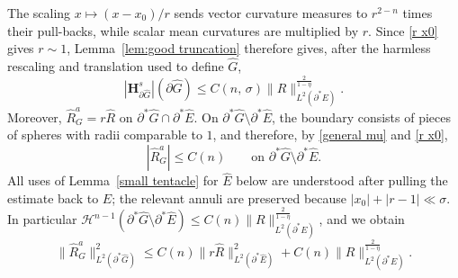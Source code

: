 \documentclass[reqno,11pt]{amsart}
\def\sz{\sigma}
\numberwithin{equation}{section}
\theoremstyle{remark}
\begin{document}
The scaling $x\mapsto (x-x_0)/r$ sends vector curvature measures to
$r^{2-n}$ times their pull-backs, while scalar mean curvatures are multiplied
by $r$. Since \eqref{r x0} gives $r\sim1$, Lemma~\ref{lem:good truncation}
therefore gives, after the harmless rescaling and translation used to define
$\hat G$,
\begin{equation}\label{RGhat singular bound}
|\mathbf H^s_{\partial\hat G}|(\partial\hat G)
\le C(n,\,\sz)\|R\|_{L^2(\partial^*E)}^{\frac{2}{1-\eta}}.
\end{equation}
Moreover, $\hat R^a_G=r\hat R$ on $\partial^*\hat G\cap \partial^*\hat E$. On $\partial^*\hat G\setminus \partial^*\hat E$, the boundary consists of pieces of spheres with radii comparable to $1$, and therefore, by \eqref{general mu} and \eqref{r x0},
$$|\hat R^a_G|\le C(n)\qquad \text{on }\partial^*\hat G\setminus \partial^*\hat E.$$
All uses of Lemma~\ref{small tentacle} for $\hat E$ below are understood after
pulling the estimate back to $E$; the relevant annuli are preserved because
$|x_0|+|r-1|\ll\sigma$. In particular
$\mathscr H^{n-1}(\partial^*\hat G\setminus \partial^*\hat E)\le C(n)\|R\|_{L^2(\partial^*E)}^{\frac{2}{1-\eta}}$, and we obtain
\begin{equation}\label{RGhat bound}
\|\hat R^a_G\|_{L^2(\partial^*\hat G)}^2 \le C(n)\|r\hat R\|_{L^2(\partial^*\hat E)}^2 + C(n)\|R\|_{L^2(\partial^*E)}^{\frac{2}{1-\eta}}.
\end{equation}
 
\end{document}
